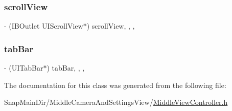 \hypertarget{interface_middle_view_controller_a07e05a1a5dafe5122a08fafcf08e2909}{}\label{interface_middle_view_controller_a07e05a1a5dafe5122a08fafcf08e2909} 
\subsubsection{\texorpdfstring{scroll\+View}{scrollView}}
{\footnotesize\ttfamily -\/ (I\+B\+Outlet U\+I\+Scroll\+View$\ast$) scroll\+View\hspace{0.3cm}{\ttfamily [read]}, {\ttfamily [write]}, {\ttfamily [nonatomic]}, {\ttfamily [strong]}}

\hypertarget{interface_middle_view_controller_a981847da359073c34502cb0fa34a08cc}{}\label{interface_middle_view_controller_a981847da359073c34502cb0fa34a08cc} 
\subsubsection{\texorpdfstring{tab\+Bar}{tabBar}}
{\footnotesize\ttfamily -\/ (U\+I\+Tab\+Bar$\ast$) tab\+Bar\hspace{0.3cm}{\ttfamily [read]}, {\ttfamily [write]}, {\ttfamily [nonatomic]}, {\ttfamily [weak]}}



The documentation for this class was generated from the following file\+:\begin{DoxyCompactItemize}
\item 
Snap\+Main\+Dir/\+Middle\+Camera\+And\+Settings\+View/\hyperlink{_middle_view_controller_8h}{Middle\+View\+Controller.\+h}\end{DoxyCompactItemize}
